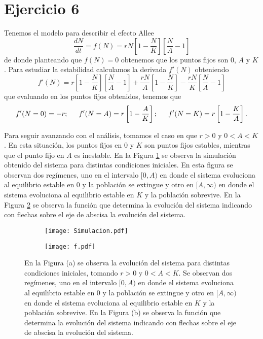 \section*{Ejercicio 6}
\graphicspath{{Figuras/ej_06/}}

Tenemos el modelo para describir el efecto Allee
\begin{equation}
    \frac{dN}{dt} = f(N) = r N \left[ 1 - \frac{N}{K} \right] \left[ \frac{N}{A} -1 \right]
\end{equation}
de donde planteando que $f(N) = 0$ obtenemos que los puntos fijos son 0, $A$ y $K$. Para estudiar la estabilidad calculamos la derivada $f'(N)$ obteniendo
\begin{equation}
    f'(N) = r \left[ 1-\frac{N}{K} \right] \left[ \frac{N}{A} -1 \right] + \frac{rN}{A} \left[ 1 - \frac{N}{K} \right] - \frac{rN}{K} \left[ \frac{N}{A}-1\right]
\end{equation}
que evaluando en los puntos fijos obtenidos, tenemos que
\begin{equation}
    f'(N=0) = -r; \indent f'(N=A)=r\left[1-\frac{A}{K}\right]; \indent f'(N=K)=r\left[1-\frac{K}{A}\right]. 
\end{equation}

Para seguir avanzando con el análisis, tomamos el caso en que $r>0$ y $0<A<K$. En esta situación, los puntos fijos en $0$ y $K$ son puntos fijos estables, mientras que el punto fijo en $A$ es inestable. En la Figura \ref{06_Simulacion} se observa la simulación obtenido del sistema para distintas condiciones iniciales. En esta figura se observan dos regímenes, uno en el intervalo $[0,A)$ en donde el sistema evoluciona al equilibrio estable en $0$ y la población se extingue y otro en $[A,\infty)$ en donde el sistema evoluciona al equilibrio estable en $K$ y la población sobrevive. En la Figura \ref{06_Funcion_y_raices} se observa la función que determina la evolución del sistema indicando con flechas sobre el eje de abscisa la evolución del sistema.

\begin{figure}
    \centering
    \begin{subfigure}[b]{0.49\textwidth}
        \texttt{[image: Simulacion.pdf]}
        \caption{}
        \label{06_Simulacion}
    \end{subfigure}
    \begin{subfigure}[b]{0.49\textwidth}
        \texttt{[image: f.pdf]}
        \caption{}
        \label{06_Funcion_y_raices}
    \end{subfigure}
    \caption{En la Figura (a) se observa la evolución del sistema para distintas condiciones iniciales, tomando $r>0$ y $0<A<K$. Se observan dos regímenes, uno en el intervalo $[0,A)$ en donde el sistema evoluciona al equilibrio estable en $0$ y la población se extingue y otro en $[A,\infty)$ en donde el sistema evoluciona al equilibrio estable en $K$ y la población sobrevive. En la Figura (b) se observa la función que determina la evolución del sistema indicando con flechas sobre el eje de abscisa la evolución del sistema. }
    \label{06_ejercicio}
\end{figure}

